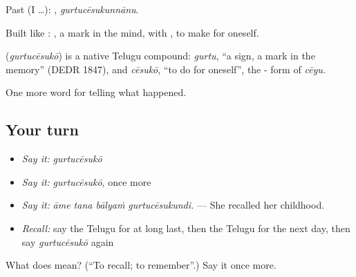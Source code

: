 Past (I …): , \emph{gurtucēsukunnānu}.

Built like : , a mark in the mind, with , to make for oneself.

\begin{cousinweb}
\textbf{} (\emph{gurtucēsukō}) is a native Telugu compound: \emph{gurtu}, \textquotedblleft{}a sign, a mark in the memory\textquotedblright{} (DEDR 1847), and \emph{cēsukō}, \textquotedblleft{}to do for oneself\textquotedblright{}, the - form of \emph{cēyu}.
\end{cousinweb}

\begin{grammarlens}[title={What you've built}]
One more word for telling what happened.
\end{grammarlens}

\subsection*{Your turn}
\begin{itemize}
\raggedright
  \item \emph{Say it:} \emph{gurtucēsukō}
  \item \emph{Say it:} \emph{gurtucēsukō}, once more
  \item \emph{Say it:} \emph{āme tana bālyaṁ gurtucēsukundi.} — She recalled her childhood.
  \item \emph{Recall:} say the Telugu for at long last, then the Telugu for the next day, then say \emph{gurtucēsukō} again
\end{itemize}

\begin{tcolorbox}[breakable,colback=teal!4,colframe=teal!35!black,title={Before you move on}]
What does  mean? (\textquotedblleft{}To recall; to remember\textquotedblright{}.) Say it once more.
\end{tcolorbox}
